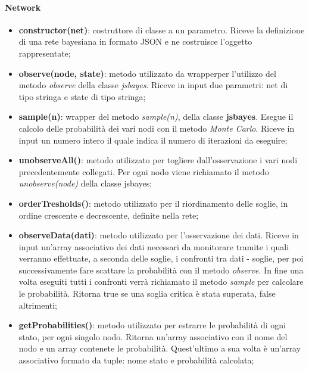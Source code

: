 \paragraph{Network}
\begin{itemize}

	\item \textbf{constructor(net)}: costruttore di classe a un parametro. Riceve la definizione di una rete 
	bayesiana in formato JSON e ne costruisce l'oggetto rappresentate; 

	\item \textbf{observe(node, state)}: metodo utilizzato da wrapper\glossario per l'utilizzo del metodo 
	\textit{observe} della classe \textit{jsbayes}. Riceve in input due parametri: net	di tipo stringa e state di 
	tipo stringa; 

	\item \textbf{sample(n)}: wrapper del metodo \textit{sample(n)}, della classe \textbf{jsbayes}. 
	Esegue il calcolo delle probabilità dei vari nodi con il metodo \textit{Monte Carlo}\glossario. Riceve in input un 
	numero intero il quale indica il numero di iterazioni da eseguire; 
	
	\item \textbf{unobserveAll()}: metodo utilizzato per togliere dall'osservazione i vari nodi precedentemente 
	collegati. Per ogni nodo viene richiamato il metodo \textit{unobserve(node)} della classe jsbayes; 
	
	\item \textbf{orderTresholds()}: metodo utilizzato per il riordinamento delle soglie, in ordine crescente e 
	decrescente, definite nella rete; 
	
	\item \textbf{observeData(dati)}: metodo utilizzato per l'osservazione dei dati. Riceve in input un'array 
	associativo dei dati necessari da monitorare tramite i quali verranno effettuate, a seconda delle 
	soglie, i confronti tra dati - soglie, per poi successivamente fare scattare la probabilità con il metodo 
	\textit{observe}. In fine una volta eseguiti tutti i confronti verrà richiamato il metodo \textit{sample} per 
	calcolare le probabilità. Ritorna true se una soglia critica è stata superata, false altrimenti; 
	
	\item \textbf{getProbabilities()}: metodo utilizzato per estrarre le probabilità di ogni stato, per ogni 
	singolo nodo. Ritorna un'array associativo con il nome del nodo e un array contenete le probabilità. 
	Quest'ultimo a sua volta è un'array associativo formato da tuple: nome stato e probabilità calcolata; 
			
\end{itemize}

